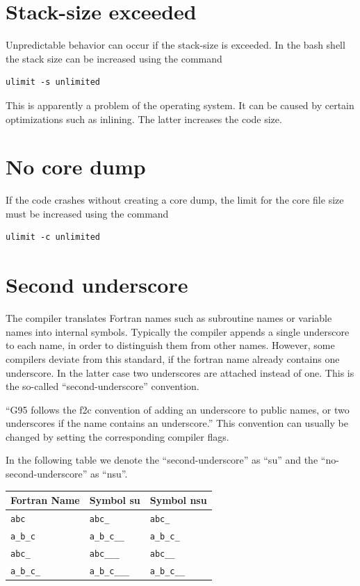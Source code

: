 \documentclass[a4paper,10pt]{report}
\begin{document}
\section{Stack-size exceeded}
Unpredictable behavior can occur if the
stack-size is exceeded. In the bash shell the stack size can be
increased using the command
\begin{verbatim}
ulimit -s unlimited
\end{verbatim}
 This is apparently a problem of the operating system. It can be
caused by certain optimizations such as inlining. The latter increases
the code size.

\section{No core dump}
If the code crashes without creating a core dump,
the limit for the core file size must be increased using the command
\begin{verbatim}
ulimit -c unlimited
\end{verbatim}

\section{Second underscore}
The compiler translates Fortran names such as subroutine names or
variable names into internal symbols. Typically the compiler appends a
single underscore to each name, in order to distinguish them from
other names. However, some compilers deviate from this standard, if
the fortran name already contains one underscore. In the latter case
two underscores are attached instead of one. This is the so-called
``second-underscore'' convention.
\begin{center}
``G95 follows the f2c convention of adding an underscore to public
names, or two underscores if the name contains an underscore.'' This
convention can usually be changed by setting the corresponding
compiler flags.
\end{center}

In the following table we denote the ``second-underscore'' as ``su''
and the ``no-second-underscore'' as ``nsu''.
\begin{center}
\begin{tabular}{|l|l|l|}
\hline
Fortran Name & Symbol su & Symbol nsu\\
\hline
\verb+abc+ & \verb+abc_+ &\verb+abc_+\\
\verb+a_b_c+ & \verb+a_b_c__+& \verb+a_b_c_+\\
\verb+abc_+ & \verb+abc___+& \verb+abc__+ \\
\verb+a_b_c_+ & \verb+a_b_c___+& \verb+a_b_c__+\\
\hline
\end{tabular}
\end{center}
\end{document}
